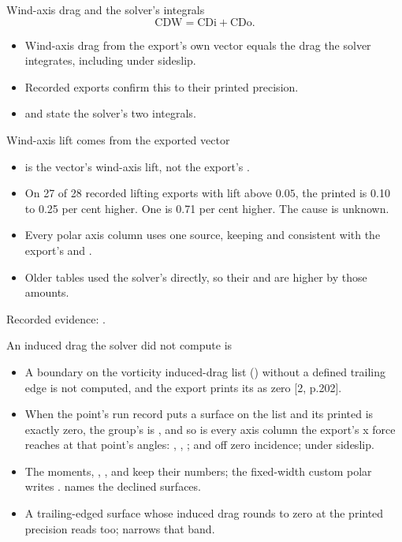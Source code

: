 \begin{frame}{Wind-axis drag and the solver's integrals}
\[
  \mathrm{CDW}=\mathrm{CDi}+\mathrm{CDo}.
\]
\begin{itemize}
  \item Wind-axis drag from the export's own vector equals the drag the
        solver integrates, including under sideslip.
  \item Recorded exports confirm this to their printed precision.
  \item {} and  state the solver's two integrals.
\end{itemize}
\end{frame}

\begin{frame}{Wind-axis lift comes from the exported vector}
\begin{itemize}\small
  \item {} is the vector's wind-axis lift, not the export's .
  \item On 27 of 28 recorded lifting exports with lift above $0.05$,
        the printed  is 0.10 to 0.25 per cent higher. One is
        0.71 per cent higher. The cause is unknown.
  \item Every polar axis column uses one source, keeping  and
         consistent with the export's  and .
  \item Older tables used the solver's  directly, so their
         and  are higher by those amounts.
\end{itemize}
\vspace{2mm}
{\scriptsize Recorded evidence:
.}
\end{frame}

\begin{frame}{An induced drag the solver did not compute is }
\begin{itemize}\small
  \item A boundary on the vorticity induced-drag list
        () without a defined trailing
        edge is not computed, and the export prints its  as zero
        [2, p.202].
  \item When the point's run record puts a surface on the list and its printed
         is exactly zero, the group's  is , and so
        is every axis column the export's x force reaches at that point's
        angles: , , ;  and 
        off zero incidence;  under sideslip.
  \item The moments, , ,  and  keep
        their numbers; the fixed-width custom polar writes .
         names the declined surfaces.
  \item A trailing-edged surface whose induced drag rounds to zero at the
        printed precision reads  too; 
        narrows that band.
\end{itemize}
\end{frame}
